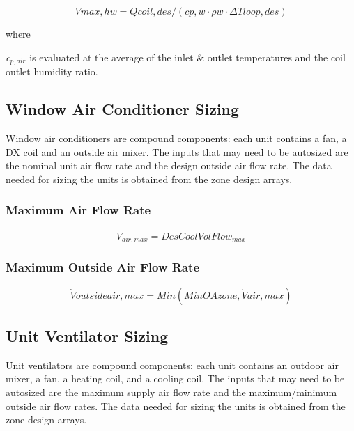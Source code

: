 \begin{equation}
\dot Vmax,hw = \dot Qcoil,des/(cp,w\cdot \rho w\cdot \Delta Tloop,des)
\end{equation}

where

\emph{c\(_{p,air}\)} is evaluated at the average of the inlet \& outlet temperatures and the coil outlet humidity ratio.

\subsection{Window Air Conditioner Sizing}\label{window-air-conditioner-sizing}

Window air conditioners are compound components: each unit contains a fan, a DX coil and an outside air mixer. The inputs that may need to be autosized are the nominal unit air flow rate and the design outside air flow rate. The data needed for sizing the units is obtained from the zone design arrays.

\subsubsection{Maximum Air Flow Rate}\label{maximum-air-flow-rate-1}

\begin{equation}
{\dot V_{air,max}} = DesCoolVolFlo{w_{max}}
\end{equation}

\subsubsection{Maximum Outside Air Flow Rate}\label{maximum-outside-air-flow-rate-1}

\begin{equation}
\dot Voutsideair,max = Min(MinOAzone,\dot Vair,max)
\end{equation}

\subsection{Unit Ventilator Sizing}\label{unit-ventilator-sizing}

Unit ventilators are compound components: each unit contains an outdoor air mixer, a fan, a heating coil, and a cooling coil. The inputs that may need to be autosized are the maximum supply air flow rate and the maximum/minimum outside air flow rates. The data needed for sizing the units is obtained from the zone design arrays.

